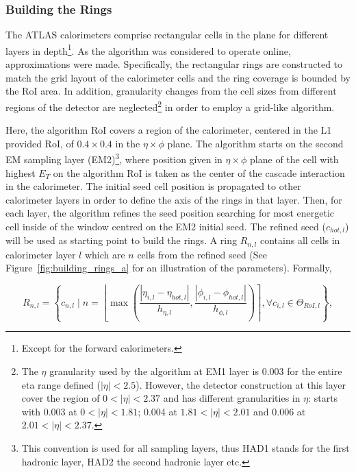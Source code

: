 \subsubsection{Building the Rings}\label{top:algorithm}

The ATLAS calorimeters comprise rectangular cells in the
\etaphi plane for different layers in depth\footnote{Except for the forward calorimeters.}.
As the algorithm was considered to operate online, approximations were made. Specifically, the rectangular rings are constructed to match the grid layout of the calorimeter cells and the ring coverage is bounded by the RoI area. In addition, granularity changes from the cell sizes from different regions of the detector are neglected\footnote{The $\eta$ granularity used by the algorithm at EM1 layer is 0.003 for the entire eta range defined ($|\eta|<2.5$). However, the detector construction at this layer cover the region of $0<|\eta|<2.37$ and has different granularities in $\eta$: starts with 0.003 at $0<|\eta|<1.81$; 0.004 at $1.81<|\eta|<2.01$ and 0.006 at $2.01<|\eta|<2.37$.} in order to employ a grid-like algorithm.


Here, the algorithm RoI covers a
region of the calorimeter, centered in the L1 provided RoI, of
$0.4\times0.4$ in the $\eta\times\phi$ plane. The algorithm
starts on the second EM sampling layer (EM2)\footnote{This convention is used for all sampling layers, thus HAD1 stands for the first hadronic layer, HAD2 the second hadronic layer etc.}, where position given in $\eta\times\phi$ plane of the cell with
highest $E_T$ on the algorithm RoI is taken as the center of the cascade
interaction in the calorimeter. The initial seed cell position is propagated to other calorimeter layers in order to define the axis of the rings in that layer. Then, for each layer, the algorithm refines the seed position searching for most energetic cell inside of the window centred on the EM2 initial seed. The refined seed ($c_{hot,l}$) will be used as starting point to build the rings. A ring $R_{n,l}$ contains all cells in calorimeter layer $l$ which are $n$ cells from the refined seed (See Figure~\ref{fig:building_rings_a} for an illustration of the parameters). Formally,


\begin{equation}
R_{n,l} = \left\{c_{n,l} \mid n = \left\lfloor \max{\left( 
\frac{| \eta_{i,l} - \eta_{hot,l} |}{h_{\eta,l}}, 
\frac{| \phi_{i,l} - \phi_{hot,l} |}{h_{\phi,l}} 
\right)} \right\rceil, 
\forall c_{i,l} \in
\Theta_{RoI,l}
\right\},
\end{equation}




